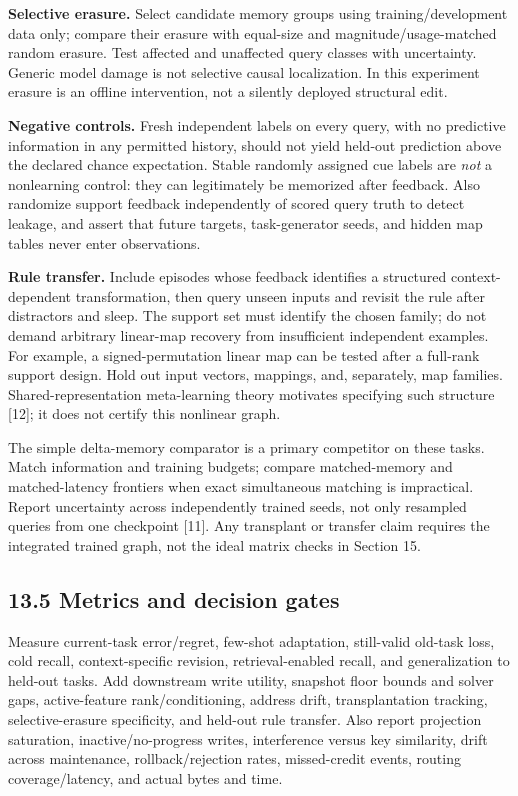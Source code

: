 \documentclass[
  11pt,
  a4paper,
]{article}
\begin{document}
\textbf{Selective erasure.} Select candidate memory groups using
training/development data only; compare their erasure with equal-size
and magnitude/usage-matched random erasure. Test affected and unaffected
query classes with uncertainty. Generic model damage is not selective
causal localization. In this experiment erasure is an offline
intervention, not a silently deployed structural edit.

\textbf{Negative controls.} Fresh independent labels on every query,
with no predictive information in any permitted history, should not
yield held-out prediction above the declared chance expectation. Stable
randomly assigned cue labels are \emph{not} a nonlearning control: they
can legitimately be memorized after feedback. Also randomize support
feedback independently of scored query truth to detect leakage, and
assert that future targets, task-generator seeds, and hidden map tables
never enter observations.

\textbf{Rule transfer.} Include episodes whose feedback identifies a
structured context-dependent transformation, then query unseen inputs
and revisit the rule after distractors and sleep. The support set must
identify the chosen family; do not demand arbitrary linear-map recovery
from insufficient independent examples. For example, a
signed-permutation linear map can be tested after a full-rank support
design. Hold out input vectors, mappings, and, separately, map families.
Shared-representation meta-learning theory motivates specifying such
structure {[}12{]}; it does not certify this nonlinear graph.

The simple delta-memory comparator is a primary competitor on these
tasks. Match information and training budgets; compare matched-memory
and matched-latency frontiers when exact simultaneous matching is
impractical. Report uncertainty across independently trained seeds, not
only resampled queries from one checkpoint {[}11{]}. Any transplant or
transfer claim requires the integrated trained graph, not the ideal
matrix checks in Section 15.

\subsection{13.5 Metrics and decision
gates}\label{metrics-and-decision-gates}

Measure current-task error/regret, few-shot adaptation, still-valid
old-task loss, cold recall, context-specific revision, retrieval-enabled
recall, and generalization to held-out tasks. Add downstream write
utility, snapshot floor bounds and solver gaps, active-feature
rank/conditioning, address drift, transplantation tracking,
selective-erasure specificity, and held-out rule transfer. Also report
projection saturation, inactive/no-progress writes, interference versus
key similarity, drift across maintenance, rollback/rejection rates,
missed-credit events, routing coverage/latency, and actual bytes and
time.
\end{document}

